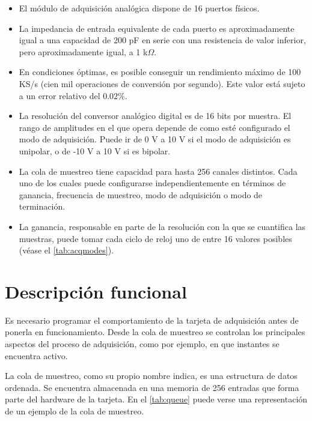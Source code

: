 \begin{itemize}
	\item El módulo de adquisición analógica dispone de 16 puertos físicos.
	\item La impedancia de entrada equivalente de cada puerto es aproximadamente igual a una capacidad de 200 pF en serie con una resistencia de valor inferior, pero aproximadamente igual, a 1 k$\Omega$.
	\item En condiciones óptimas, es posible conseguir un rendimiento máximo de 100 KS/s (cien mil operaciones de conversión por segundo). Este valor está sujeto a un error relativo del $0.02\%$.
	\item La resolución del conversor analógico digital es de 16 bits por muestra. El rango de amplitudes en el que opera depende de como esté configurado el modo de adquisición. Puede ir de 0 V a 10 V si el modo de adquisición es unipolar, o de -10 V a 10 V si es bipolar.
	\item La cola de muestreo tiene capacidad para hasta 256 canales distintos. Cada uno de los cuales puede configurarse independientemente en términos de ganancia, frecuencia de muestreo, modo de adquisición o modo de terminación.
	\item La ganancia, responsable en parte de la resolución con la que se cuantifica las muestras, puede tomar cada ciclo de reloj uno de entre 16 valores posibles (véase el \vref{tab:acqmodes}).
\end{itemize}


\section{Descripción funcional}\label{sec:funcdesc}

Es necesario programar el comportamiento de la tarjeta de adquisición antes de ponerla en funcionamiento. Desde la cola de muestreo se controlan los principales aspectos del proceso de adquisición, como por ejemplo, en que instantes se encuentra activo.\par
La cola de muestreo, como su propio nombre indica, es una estructura de datos ordenada. Se encuentra almacenada en una memoria  de 256 entradas que forma parte del hardware de la tarjeta. En el \cref{tab:queue} puede verse una representación de un ejemplo de la cola de muestreo.\par


